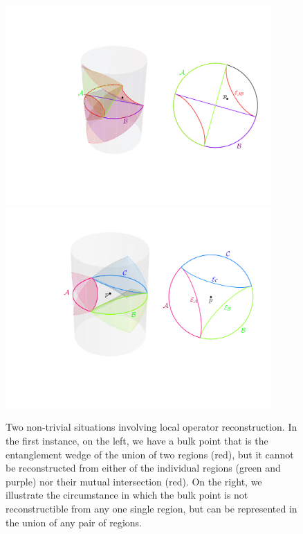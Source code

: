 \documentclass[12pt,openany]{book}
\begin{document}
\begin{figure}[ht!]
\begin{center}
\includegraphics[width=4in]{figures/ecc-AB}
\vspace{1cm}
\includegraphics[width=4in]{figures/ecc-ABC}
\caption{ Two non-trivial situations involving local operator reconstruction. In the first instance, on the left, we have  a bulk point that is the  entanglement wedge of the union of two regions (red), but it cannot be reconstructed from either of the individual regions (green and purple) nor their mutual intersection (red). On the right, we illustrate the circumstance in which the bulk point is not reconstructible from any one single region, but can be represented in the union of any pair of regions.
}
\label{f:codewedgesABC}
\end{center}
\end{figure}
%
\end{document}
